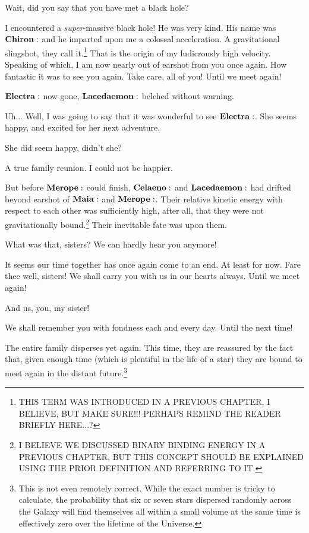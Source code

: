 \documentclass[main.tex]{subfiles}
\begin{document}
\Maia Wait, did you say that you have met a black hole?

\Electra I encountered a \textit{super}-massive black hole!  He was very kind.  His name was $\Chiron$ and he imparted upon me a colossal acceleration.  A gravitational slingshot, they call it.\footnote{THIS TERM WAS INTRODUCED IN A PREVIOUS CHAPTER, I BELIEVE, BUT MAKE SURE!!!  PERHAPS REMIND THE READER BRIEFLY HERE...?}  That is the origin of my ludicrously high velocity.  Speaking of which, I am now nearly out of earshot from you once again.  How fantastic it was to see you again.  Take care, all of you!  Until we meet again! 


$\Electra$ now gone, $\Lacedaemon$ belched without warning.

\Celaeno Uh... Well, I was going to say that it was wonderful to see $\Electra$.  She seems happy, and excited for her next adventure.

\Maia She did seem happy, didn't she?  

\Merope A true family reunion.  I could not be happier.

But before $\Merope$ could finish, $\Celaeno$ and $\Lacedaemon$ had drifted beyond earshot of $\Maia$ and $\Merope$.  Their relative kinetic energy with respect to each other was sufficiently high, after all, that they were not gravitationally bound.\footnote{I BELIEVE WE DISCUSSED BINARY BINDING ENERGY IN A PREVIOUS CHAPTER, BUT THIS CONCEPT SHOULD BE EXPLAINED USING THE PRIOR DEFINITION AND REFERRING TO IT.}  Their inevitable fate was upon them.

\Lacedaemon What was that, sisters?  We can hardly hear you anymore!

\Celaeno It seems our time together has once again come to an end.  At least for now.  Fare thee well, sisters!  We shall carry you with us in our hearts always.  Until we meet again!

\Maia And us, you, my sister!

\Merope We shall remember you with fondness each and every day.  Until the next time!  

The entire family disperses yet again.  This time, they are reassured by the fact that, given enough time (which is plentiful in the life of a star) they are bound to meet again in the distant future.\footnote{This is not even remotely correct.  While the exact number is tricky to calculate, the probability that six or seven stars dispersed randomly across the Galaxy will find themselves all within a small volume at the same time is effectively zero over the lifetime of the Universe.}

\end{document}
